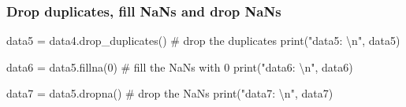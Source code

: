 \documentclass[
  letterpaper,
  DIV=11,
  numbers=noendperiod]{scrreprt}
\newenvironment{Shaded}{\begin{snugshade}}{\end{snugshade}}
\newcommand{\BuiltInTok}[1]{\textcolor[rgb]{0.00,0.23,0.31}{#1}}
\newcommand{\CharTok}[1]{\textcolor[rgb]{0.13,0.47,0.30}{#1}}
\newcommand{\CommentTok}[1]{\textcolor[rgb]{0.37,0.37,0.37}{#1}}
\newcommand{\DecValTok}[1]{\textcolor[rgb]{0.68,0.00,0.00}{#1}}
\newcommand{\NormalTok}[1]{\textcolor[rgb]{0.00,0.23,0.31}{#1}}
\newcommand{\OperatorTok}[1]{\textcolor[rgb]{0.37,0.37,0.37}{#1}}
\newcommand{\StringTok}[1]{\textcolor[rgb]{0.13,0.47,0.30}{#1}}
\begin{document}
\subsubsection*{Drop duplicates, fill NaNs and drop
NaNs}\label{drop-duplicates-fill-nans-and-drop-nans}

\begin{Shaded}
\begin{Highlighting}[]
\NormalTok{data5 }\OperatorTok{=}\NormalTok{ data4.drop\_duplicates() }\CommentTok{\# drop the duplicates}
\BuiltInTok{print}\NormalTok{(}\StringTok{"data5: }\CharTok{\textbackslash{}n}\StringTok{"}\NormalTok{, data5)}

\NormalTok{data6 }\OperatorTok{=}\NormalTok{ data5.fillna(}\DecValTok{0}\NormalTok{) }\CommentTok{\# fill the NaNs with 0}
\BuiltInTok{print}\NormalTok{(}\StringTok{"data6: }\CharTok{\textbackslash{}n}\StringTok{"}\NormalTok{, data6)}

\NormalTok{data7 }\OperatorTok{=}\NormalTok{ data5.dropna() }\CommentTok{\# drop the NaNs}
\BuiltInTok{print}\NormalTok{(}\StringTok{"data7: }\CharTok{\textbackslash{}n}\StringTok{"}\NormalTok{, data7)}
\end{Highlighting}
\end{Shaded}
\end{document}
